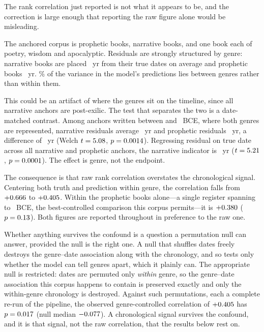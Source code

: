 \documentclass[10pt,letterpaper]{article}
\begin{document}
The rank correlation just reported is not what it appears to be, and the
correction is large enough that reporting the raw figure alone would be
misleading.

The anchored corpus is \GNnProph{} prophetic books, \GNnNar{} narrative books,
and one book each of poetry, wisdom and apocalyptic.  Residuals are strongly
structured by genre: narrative books are placed \GNoffNar~yr from their true
dates on average and prophetic books \GNoffPro~yr.  \GNbetween\% of the
variance in the model's predictions lies between genres rather than within
them.

This could be an artifact of where the genres sit on the timeline, since all
\GNnNar{} narrative anchors are post-exilic.  The test that separates the two
is a date-matched contrast.  Among anchors written between \GNwinHi{} and
\GNwinLo~BCE, where both genres are represented, narrative residuals average
\GNwinNar~yr and prophetic residuals \GNwinPro~yr, a difference of
\GNwinDiff~yr (Welch $t = 5.08$, $p = 0.0014$).  Regressing residual on
true date across all narrative and prophetic anchors, the narrative indicator
is \GNregNar~yr ($t = 5.21$, $p = 0.0001$).  The effect is genre, not the
endpoint.

The consequence is that raw rank correlation overstates the chronological
signal.  Centering both truth and prediction within genre, the correlation
falls from $+0.666$ to $+0.405$.  Within the \GNnProph{} prophetic
books alone---a single register spanning \GNprophHi{} to \GNprophLo~BCE, the
best-controlled comparison this corpus permits---it is $+0.380$ ($p =
0.13$).  Both figures are reported throughout in preference to the raw
one.

Whether anything survives the confound is a question a permutation null can
answer, provided the null is the right one.  A null that shuffles dates freely
destroys the genre--date association along with the chronology, and so tests
only whether the model can tell genres apart, which it plainly can.  The
appropriate null is restricted: dates are permuted only \emph{within} genre, so
the genre--date association this corpus happens to contain is preserved exactly
and only the within-genre chronology is destroyed.  Against \GNnullN{} such
permutations, each a complete re-run of the pipeline, the observed
genre-controlled correlation of $+0.405$ has $p = 0.017$ (null median
$-0.077$).  A chronological signal survives the confound, and it is that
signal, not the raw correlation, that the results below rest on.
\end{document}
